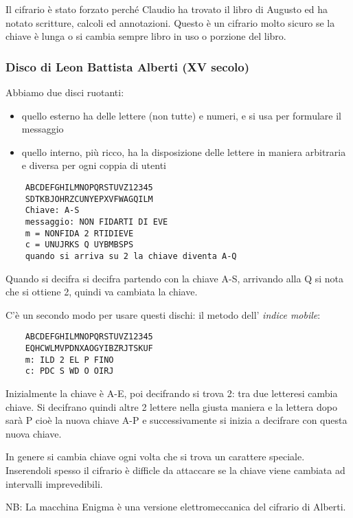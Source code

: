 Il cifrario è stato forzato perché Claudio ha trovato il libro di Augusto ed ha notato scritture, calcoli ed annotazioni.
Questo è un cifrario molto sicuro se la chiave è lunga o si cambia sempre libro in uso o porzione del libro.

\subsubsection{Disco di Leon Battista Alberti (XV secolo)}
Abbiamo due disci ruotanti:
\begin{itemize}
    \item quello esterno ha delle lettere (non tutte) e numeri, e si usa per formulare il messaggio
    \item quello interno, più ricco, ha la disposizione delle lettere in maniera arbitraria e diversa per ogni coppia di utenti
\end{itemize}

\begin{verbatim}
    ABCDEFGHILMNOPQRSTUVZ12345
    SDTKBJOHRZCUNYEPXVFWAGQILM
    Chiave: A-S
    messaggio: NON FIDARTI DI EVE
    m = NONFIDA 2 RTIDIEVE
    c = UNUJRKS Q UYBMBSPS
    quando si arriva su 2 la chiave diventa A-Q
\end{verbatim}

Quando si decifra si decifra partendo con la chiave A-S, arrivando alla Q si nota che si ottiene 2, quindi va cambiata la chiave.

C'è un secondo modo per usare questi dischi: il metodo dell' \emph{indice mobile}:
\begin{verbatim}
    ABCDEFGHILMNOPQRSTUVZ12345
    EQHCWLMVPDNXAOGYIBZRJTSKUF
    m: ILD 2 EL P FINO
    c: PDC S WD O OIRJ
\end{verbatim}

Inizialmente la chiave è A-E, poi decifrando si trova 2: tra due letteresi cambia chiave. Si decifrano quindi altre 2 lettere nella giusta maniera e la lettera dopo sarà P cioè la nuova chiave A-P e successivamente si inizia a decifrare con questa nuova chiave.

In genere si cambia chiave ogni volta che si trova un carattere speciale. Inserendoli spesso il cifrario è difficle da attaccare se la chiave viene cambiata ad intervalli imprevedibili.

NB: La macchina Enigma è una versione elettromeccanica del cifrario di Alberti.

